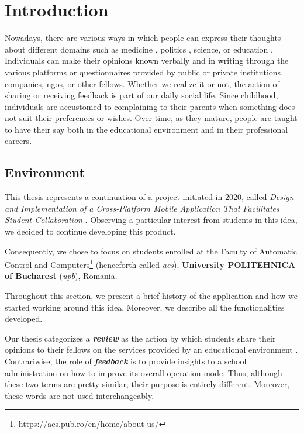 \chapter{Introduction} \label{chapter1}

    Nowadays, there are various ways in which people can express their thoughts about different domains such as medicine \cite{feedbackmedicine2011}, politics \cite{feedbackpolitics2014}, science, or education \cite{feedbackeducation2019}. Individuals can make their opinions known verbally and in writing through the various platforms or questionnaires provided by public or private institutions, companies, \acrshort{ngo}s, or other fellows. Whether we realize it or not, the action of sharing or receiving feedback is part of our daily social life. Since childhood, individuals are accustomed to complaining to their parents when something does not suit their preferences or wishes. Over time, as they mature, people are taught to have their say both in the educational environment and in their professional careers.

\section{Environment} \label{1:environment}

    This thesis represents a continuation of a project initiated in 2020, called \textit{Design and Implementation of a Cross-Platform Mobile Application That Facilitates Student Collaboration} \cite{ioana2020paper}. Observing a particular interest from students in this idea, we decided to continue developing this product.
    
    Consequently, we chose to focus on students enrolled at the Faculty of Automatic Control and Computers\footnote{https://acs.pub.ro/en/home/about-us/} (henceforth called \textit{\acrshort{acs}}), \textbf{University POLITEHNICA of Bucharest} (\textit{\acrshort{upb}}), Romania.
    
    Throughout this section, we present a brief history of the application and how we started working around this idea. Moreover, we describe all the functionalities developed.
    
    Our thesis categorizes a \textbf{\textit{review}} as the action by which students share their opinions to their fellows on the services provided by an educational environment \cite{reviewvsfeedback}. Contrariwise, the role of \textbf{\textit{feedback}} is to provide insights to a school administration on how to improve its overall operation mode. Thus, although these two terms are pretty similar, their purpose is entirely different. Moreover, these words are not used interchangeably.
    
